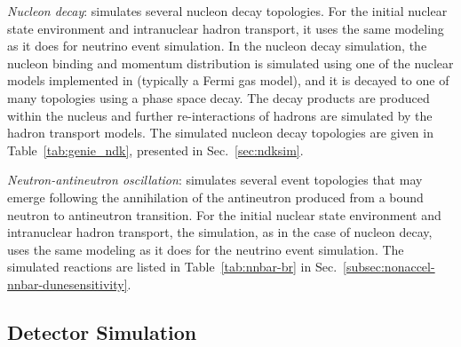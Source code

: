 \textit{Nucleon decay}:  simulates several nucleon decay topologies. For the initial nuclear state environment and intranuclear hadron transport, it uses the same modeling as it does for neutrino event simulation. In the nucleon decay simulation, the nucleon binding and momentum distribution is simulated using one of the nuclear models implemented in  (typically a Fermi gas model), and it is decayed to one of many topologies using a phase space decay. The decay products are produced within the nucleus and further re-interactions of hadrons are simulated by the  hadron transport models. The simulated nucleon decay topologies are given in Table~\ref{tab:genie_ndk}, presented in 
Sec.~\ref{sec:ndksim}.

\textit{Neutron-antineutron oscillation}:  simulates several event topologies that may emerge following the annihilation of the antineutron produced from a bound neutron to antineutron transition. For the initial nuclear state environment and intranuclear hadron transport, the simulation, as in the case of nucleon decay, uses the same modeling as it does for the neutrino event simulation. The simulated reactions are listed in Table~\ref{tab:nnbar-br} in 
Sec.~\ref{subsec:nonaccel-nnbar-dunesensitivity}.


\subsection{Detector Simulation}
\label{sec:tools-mc-detsim}


